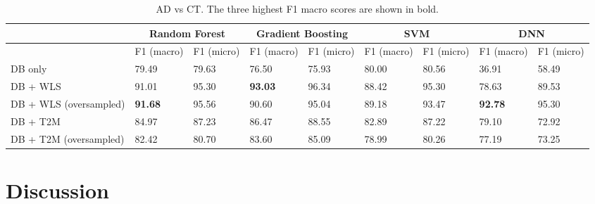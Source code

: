 \documentclass{article}
\begin{document}
\begin{table}[h]
\caption{AD vs CT. The three highest F1 macro scores are shown in bold.}
\centering
\begin{tabular}{|p{2cm}||p{1cm}p{1cm}|p{1cm}p{1cm}|p{1cm}p{1cm}|p{1cm}p{1cm}|}
\hline
                         & \multicolumn{2}{c|}{Random Forest} & \multicolumn{2}{c|}{Gradient Boosting} & \multicolumn{2}{c|}{SVM} & \multicolumn{2}{c|}{DNN} \\ \hline
                         & F1 \newline (macro)       & F1 \newline (micro)      & F1 \newline (macro)         & F1 \newline (micro)        & F1 \newline (macro)  & F1 \newline (micro) & F1 \newline (macro)  & F1 \newline (micro) \\ \hline 
DB only                  &                               79.49   & 79.63 & 76.50 & 75.93 & 80.00 & 80.56 & 36.91 & 58.49 \\ \hline
DB + WLS               &                             91.01   &  95.30 & \textbf{93.03} & 96.34 & 88.42 & 95.30 & 78.63 &  89.53  \\ \hline
DB + WLS \newline (oversampled)    &    \textbf{91.68} & 95.56 & 90.60 & 95.04 & 89.18 & 93.47 & \textbf{92.78} & 95.30  \\ \hline
DB + T2M           &                            84.97 &  87.23 & 86.47  & 88.55 & 82.89 & 87.22 & 79.10 & 72.92 \\ \hline
DB + T2M \newline (oversampled) & 82.42 &  80.70 & 83.60 & 85.09 & 78.99 & 80.26 & 77.19  & 73.25 \\ \hline
\end{tabular}
\label{binaryclassification}
\end{table}



\section{Discussion}
\end{document}
